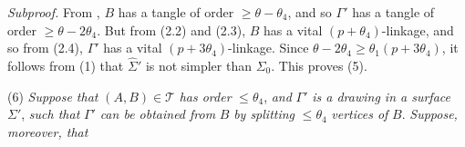 \textit{Subproof.} From , $B$ has a tangle of order $\ge \theta - \theta_4$, and so $\Gamma'$ has a tangle of order $\ge \theta - 2\theta_4$. But from (2.2) and (2.3), $B$ has a vital $(p + \theta_4)$-linkage, and so from (2.4), $\Gamma'$ has a vital $(p + 3\theta_4)$-linkage. Since $\theta - 2\theta_4 \ge \theta_1(p + 3\theta_4)$, it follows from (1) that $\hat{\Sigma}'$ is not simpler than $\Sigma_0$. This proves (5).

\hspace*{12pt}(6) \textit{Suppose that} $(A, B) \in \mathcal{T}$ \textit{has order} $\le \theta_4$, \textit{and} $\Gamma'$ \textit{is a drawing in a surface} $\Sigma'$, \textit{such that} $\Gamma'$ \textit{can be obtained from} $B$ \textit{by splitting} $\le \theta_4$ \textit{vertices of} $B$. \textit{Suppose, moreover, that}
